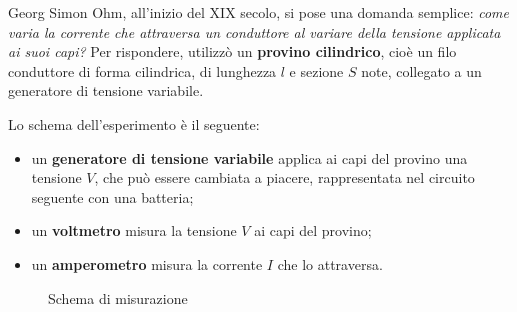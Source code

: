 Georg Simon Ohm, all'inizio del XIX secolo, si pose una domanda semplice: \emph{come varia la corrente che attraversa un conduttore al variare della tensione applicata ai suoi capi?} Per rispondere, utilizzò un \textbf{provino cilindrico}, cioè un filo conduttore di forma cilindrica, di lunghezza \(l\) e sezione \(S\) note, collegato a un generatore di tensione variabile.

Lo schema dell'esperimento è il seguente:
\begin{itemize}[leftmargin=1cm]
  \item un \textbf{generatore di tensione variabile} applica ai capi del provino una tensione \(V\), che può essere cambiata a piacere, rappresentata nel circuito seguente con una batteria;
  \item un \textbf{voltmetro} misura la tensione \(V\) ai capi del provino;
  \item un \textbf{amperometro} misura la corrente \(I\) che lo attraversa.
\end{itemize}





\begin{figure}[htbp]
  \centering
  \caption{Schema di misurazione}
  \label{fig:schema_misura}
\end{figure}








